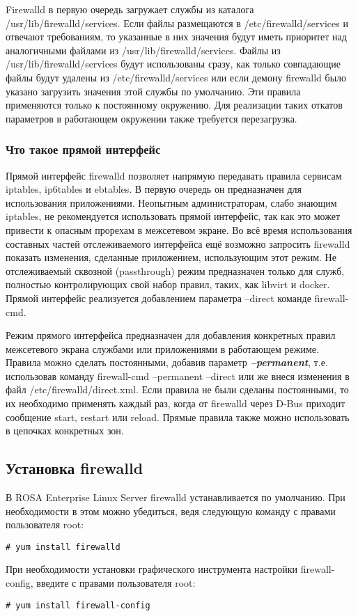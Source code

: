 \documentclass[a4paper,10pt,twoside]{article}
\begin{document}
Firewalld в первую очередь загружает службы из каталога /usr/lib/firewalld/services. Если файлы размещаются в /etc/firewalld/services и отвечают требованиям, то указанные в них значения будут иметь приоритет над аналогичными файлами из /usr/lib/firewalld/services. Файлы из /usr/lib/firewalld/services будут использованы сразу, как только совпадающие файлы будут удалены из /etc/firewalld/services или если демону firewalld было указано загрузить значения этой службы по умолчанию. Эти правила применяются только к постоянному окружению.  Для реализации таких откатов параметров в работающем окружении также требуется перезагрузка.



\subsubsection{Что такое прямой интерфейс}
Прямой интерфейс firewalld позволяет напрямую передавать правила сервисам iptables, ip6tables и ebtables. В первую очередь он предназначен для использования приложениями. Неопытным администраторам, слабо знающим iptables, не рекомендуется использовать прямой интерфейс, так как это может привести к опасным прорехам в межсетевом экране. Во всё время использования составных частей отслеживаемого интерфейса ещё возможно запросить firewalld показать изменения, сделанные приложением, использующим этот режим. Не отслеживаемый сквозной (passthrough) режим предназначен только для служб, полностью контролирующих свой набор правил, таких, как libvirt и docker. Прямой интерфейс реализуется добавлением параметра --direct команде firewall-cmd.

Режим прямого интерфейса предназначен для добавления конкретных правил межсетевого экрана службами или приложениями в работающем режиме. Правила можно сделать постоянными, добавив параметр \textit{\textbf{--permanent}}, т.е. использовав команду firewall-cmd --permanent --direct или же внеся изменения в файл /etc/firewalld/direct.xml. Если правила не были сделаны постоянными, то их необходимо применять каждый раз, когда от firewalld  через D-Bus  приходит сообщение start, restart или reload. Прямые правила также можно использовать в цепочках конкретных зон.

\subsection{Установка firewalld}
В ROSA Enterprise Linux Server firewalld устанавливается по умолчанию. При необходимости в этом можно убедиться, ведя следующую команду с правами пользователя root: 
\begin{verbatim}
# yum install firewalld
\end{verbatim} 
При необходимости установки графического инструмента настройки firewall-config, введите с правами пользователя root:
\begin{verbatim}
# yum install firewall-config
\end{verbatim} 
\end{document}
